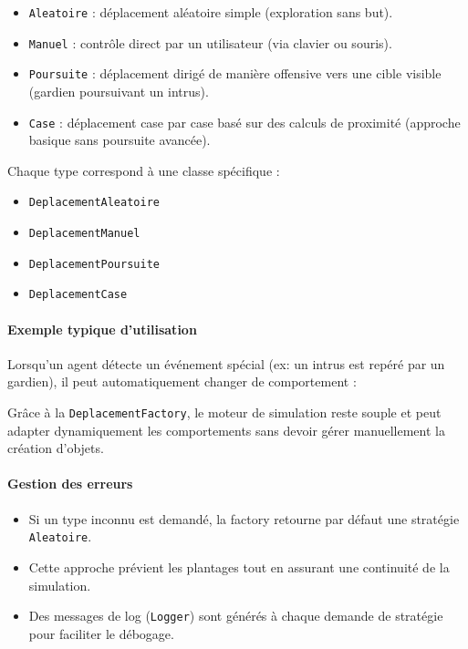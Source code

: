 \begin{itemize}
    \item \texttt{Aleatoire} : déplacement aléatoire simple (exploration sans but).
    \item \texttt{Manuel} : contrôle direct par un utilisateur (via clavier ou souris).
    \item \texttt{Poursuite} : déplacement dirigé de manière offensive vers une cible visible (gardien poursuivant un intrus).
    \item \texttt{Case} : déplacement case par case basé sur des calculs de proximité (approche basique sans poursuite avancée).
\end{itemize}

Chaque type correspond à une classe spécifique :
\begin{itemize}
    \item \texttt{DeplacementAleatoire}
    \item \texttt{DeplacementManuel}
    \item \texttt{DeplacementPoursuite}
    \item \texttt{DeplacementCase}
\end{itemize}

\vspace{1em}
\paragraph{Exemple typique d'utilisation}

Lorsqu'un agent détecte un événement spécial (ex: un intrus est repéré par un gardien), il peut automatiquement changer de comportement :


Grâce à la \texttt{DeplacementFactory}, le moteur de simulation reste souple et peut adapter dynamiquement les comportements sans devoir gérer manuellement la création d'objets.

\vspace{1em}
\paragraph{Gestion des erreurs }

\begin{itemize}
    \item Si un type inconnu est demandé, la factory retourne par défaut une stratégie \texttt{Aleatoire}.
    \item Cette approche prévient les plantages tout en assurant une continuité de la simulation.
    \item Des messages de log (\texttt{Logger}) sont générés à chaque demande de stratégie pour faciliter le débogage.
\end{itemize}

